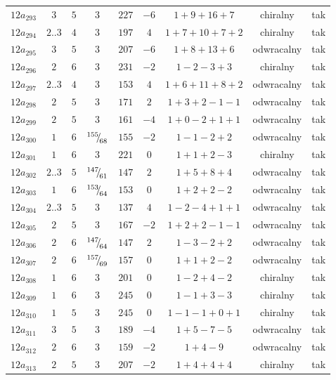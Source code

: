 \begin{longtable}{ccccccccc}
$12a_{293}$ & $3$ & $5$ & $3$ & $227$ & $-6$ & $1+9+16+7$ & chiralny & tak \\
$12a_{294}$ & $2..3$ & $4$ & $3$ & $197$ & $4$ & $1+7+10+7+2$ & chiralny & tak \\
$12a_{295}$ & $3$ & $5$ & $3$ & $207$ & $-6$ & $1+8+13+6$ & odwracalny & tak \\
$12a_{296}$ & $2$ & $6$ & $3$ & $231$ & $-2$ & $1-2-3+3$ & chiralny & tak \\
$12a_{297}$ & $2..3$ & $4$ & $3$ & $153$ & $4$ & $1+6+11+8+2$ & odwracalny & tak \\
$12a_{298}$ & $2$ & $5$ & $3$ & $171$ & $2$ & $1+3+2-1-1$ & odwracalny & tak \\
$12a_{299}$ & $2$ & $5$ & $3$ & $161$ & $-4$ & $1+0-2+1+1$ & odwracalny & tak \\
$12a_{300}$ & $1$ & $6$ & ${}^{155}{\mskip -5mu/\mskip -3mu}_{68}$ & $155$ & $-2$ & $1-1-2+2$ & odwracalny & tak \\
$12a_{301}$ & $1$ & $6$ & $3$ & $221$ & $0$ & $1+1+2-3$ & chiralny & tak \\
$12a_{302}$ & $2..3$ & $5$ & ${}^{147}{\mskip -5mu/\mskip -3mu}_{61}$ & $147$ & $2$ & $1+5+8+4$ & odwracalny & tak \\
$12a_{303}$ & $1$ & $6$ & ${}^{153}{\mskip -5mu/\mskip -3mu}_{64}$ & $153$ & $0$ & $1+2+2-2$ & odwracalny & tak \\
$12a_{304}$ & $2..3$ & $5$ & $3$ & $137$ & $4$ & $1-2-4+1+1$ & odwracalny & tak \\
$12a_{305}$ & $2$ & $5$ & $3$ & $167$ & $-2$ & $1+2+2-1-1$ & odwracalny & tak \\
$12a_{306}$ & $2$ & $6$ & ${}^{147}{\mskip -5mu/\mskip -3mu}_{64}$ & $147$ & $2$ & $1-3-2+2$ & odwracalny & tak \\
$12a_{307}$ & $2$ & $6$ & ${}^{157}{\mskip -5mu/\mskip -3mu}_{69}$ & $157$ & $0$ & $1+1+2-2$ & odwracalny & tak \\
$12a_{308}$ & $1$ & $6$ & $3$ & $201$ & $0$ & $1-2+4-2$ & chiralny & tak \\
$12a_{309}$ & $1$ & $6$ & $3$ & $245$ & $0$ & $1-1+3-3$ & chiralny & tak \\
$12a_{310}$ & $1$ & $5$ & $3$ & $245$ & $0$ & $1-1-1+0+1$ & chiralny & tak \\
$12a_{311}$ & $3$ & $5$ & $3$ & $189$ & $-4$ & $1+5-7-5$ & odwracalny & tak \\
$12a_{312}$ & $2$ & $6$ & $3$ & $159$ & $-2$ & $1+4-9$ & odwracalny & tak \\
$12a_{313}$ & $2$ & $5$ & $3$ & $207$ & $-2$ & $1+4+4+4$ & chiralny & tak \\

\end{longtable}
